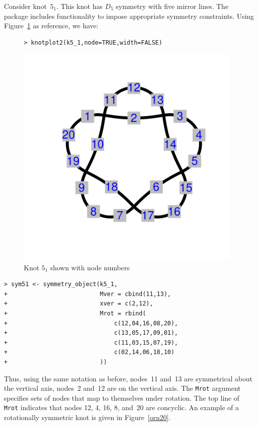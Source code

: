 \documentclass{birkjour}
\theoremstyle{definition}
\theoremstyle{remark}
\numberwithin{equation}{section}
\begin{document}
Consider knot~$5_1$. This knot has $D_5$ symmetry with five mirror
lines.  The package includes functionality to impose appropriate
symmetry constraints. Using Figure~\ref{k5_1_twoknots} as reference,
we have:

\begin{figure}[htbp]
  \begin{center}
\begin{verbatim}
> knotplot2(k5_1,node=TRUE,width=FALSE)
\end{verbatim}
\includegraphics[width=11cm]{knot-k5_1}
\caption{Knot $5_1$ \label{k5_1_twoknots} shown with node numbers}
  \end{center}
\end{figure}

\begin{verbatim}
> sym51 <- symmetry_object(k5_1,
+                          Mver = cbind(11,13),
+                          xver = c(2,12),
+                          Mrot = rbind(
+                              c(12,04,16,08,20),
+                              c(13,05,17,09,01),
+                              c(11,03,15,07,19),
+                              c(02,14,06,18,10)
+                          ))
\end{verbatim}

Thus, using the same notation as before, nodes~11 and~13 are
symmetrical about the vertical axis, nodes~2 and~12 are on the
vertical axis.  The {\tt Mrot} argument specifies sets of nodes that
map to themselves under rotation.  The top line of {\tt Mrot}
indicates that nodes 12, 4, 16, 8, and~20 are concyclic.  An example
of a rotationally symmetric knot is given in Figure~\ref{orn20}.
\end{document}
